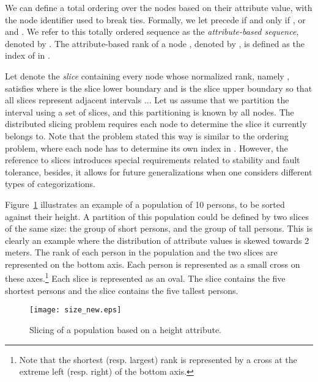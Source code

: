 \documentclass[times,10pt,twocolumn]{article}
\newcommand{\remove}[1]{}
\begin{document}
We can define a total ordering over the nodes based on their attribute value,
with the node identifier used to break ties.
Formally, we let  precede  if and only if , or
 and . We refer to this totally ordered sequence as the
\emph{attribute-based sequence}, denoted by . The attribute-based
rank of a node , denoted by , is defined as the index
of  in . 
\remove{
For instance, let us consider three nodes: 1, 2, and 3, with three
different attribute values , , and .
In this case, the attribute-based rank of node  would be
.
In the rest of the paper, we assume that nodes are sorted according to a single 
attribute and that each node belongs to a unique slice.
The sorting along several attributes is out of the scope of this paper.
} 

\label{ssec:pb}

Let  denote the \emph{slice} containing every node  whose
normalized rank, namely , satisfies 
where  is the slice lower boundary and  is 
the slice upper boundary so that all slices represent adjacent intervals ...
Let us assume that we partition the interval  using a set of slices,
and this partitioning is known by all nodes.
The distributed slicing problem requires each node 
to determine the slice it currently belongs to.
Note that the problem stated this way is similar to the
ordering problem, where each node has to determine its own index in
.
However, the reference to slices introduces special requirements related to
stability and fault tolerance, besides, it allows for future generalizations
when one considers different types of categorizations.

Figure~\ref{fig:size} illustrates an example 
of  a population of 10 persons, to be sorted 
against their height.
A partition of this population could be defined by two slices of the same
size: the group of short persons, and the 
group of tall persons. This is clearly an example 
where the distribution of attribute values is skewed towards 2 meters.
 The rank of each person in
the population and the two slices are represented on the bottom axis. Each
person is represented as a small cross on these axes.\footnote{Note that the shortest (resp. largest) rank is represented by a cross at the 
extreme left (resp. right) of the bottom axis.} 
Each slice is represented as an oval.  The slice  contains the five shortest persons and 
the slice  contains the five tallest
persons.

\begin{figure}[t]
\centering\texttt{[image: size\_new.eps]}
\caption{Slicing of a population based on a height attribute.}
\label{fig:size}
\end{figure}
\end{document}
